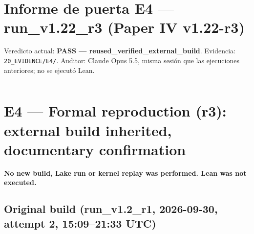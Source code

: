 \documentclass[
]{article}
\author{}
\date{}
\begin{document}
\section{Informe de puerta E4 --- run\_v1.22\_r3 (Paper IV
v1.22-r3)}\label{informe-de-puerta-e4--run_v122_r3-paper-iv-v122-r3}

Veredicto actual: \textbf{PASS --- reused\_verified\_external\_build}.
Evidencia: \texttt{20\_EVIDENCE/E4/}. Auditor: Claude Opus 5.5, misma
sesión que las ejecuciones anteriores; no se ejecutó Lean.

\begin{center}\rule{0.5\linewidth}{0.5pt}\end{center}

\section{E4 --- Formal reproduction (r3): external build inherited,
documentary
confirmation}\label{e4--formal-reproduction-r3-external-build-inherited-documentary-confirmation}

\textbf{No new build, Lake run or kernel replay was performed. Lean was
not executed.}

\subsection{Original build (run\_v1.2\_r1, 2026-09-30, attempt 2,
15:09--21:33
UTC)}\label{original-build-run_v12_r1-2026-09-30-attempt-2-15092133-utc}
\end{document}
